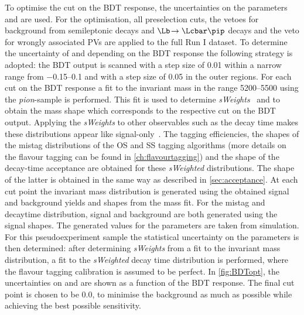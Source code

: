 To optimise the cut on the \ac{BDT} response, the uncertainties on the \CP parameters \Sf and \Sfbar are used.
For the optimisation, all preselection cuts, the vetoes for background from semileptonic decays and $\Lb\!\to\Lcbar\pip$ decays and the veto for wrongly associated \ac{PV}s are applied to the full Run I dataset.
To determine the uncertainty of \Sf and \Sfbar depending on the \ac{BDT} response the following strategy is adopted:
the \ac{BDT} output is scanned with a step size of \num{0.01} within a narrow range from \numrange{-0.15}{0.1} and with a step size of \num{0.05} in the outer regions.
For each cut on the \ac{BDT} response a fit to the invariant \Bz mass in the range \SIrange[per-mode=symbol]{5200}{5500}{\MeVcc} using the \emph{pion}-sample is performed.
This fit is used to determine \emph{sWeights}~\cite{Pivk:2004ty} and to obtain the mass shape which corresponds to the respective cut on the \ac{BDT} output.
Applying the \emph{sWeights} to other observables such as the decay time makes these distributions appear like signal-only~\cite{2009arXiv0905.0724X}.
The tagging efficiencies, the shapes of the mistag distributions of the OS and SS tagging algorithms (more details on the flavour tagging can be found in \cref{ch:flavourtagging}) and the shape of the decay-time acceptance are obtained for these \emph{sWeighted} distributions.
The shape of the latter is obtained in the same way as described in \cref{sec:acceptance}.
At each cut point the invariant mass distribution is generated using the obtained signal and background yields and shapes from the mass fit.
For the mistag and decaytime distribution, signal and background are both generated using the signal shapes.
The generated values for the \CP parameters are taken from simulation.
For this pseudoexperiment sample the statistical uncertainty on the \CP parameters is then determined: after determining \emph{sWeights} from a fit to the invariant \Bz mass distribution, a \CP fit to the \emph{sWeighted} decay time distribution is performed, where the flavour tagging calibration is assumed to be perfect.
In \cref{fig:BDTopt}, the uncertainties on \Sf and \Sfbar are shown as a function of the \ac{BDT} response.
The final cut point is chosen to be \num{0.0}, to minimise the background as much as possible while achieving the best possible sensitivity.
